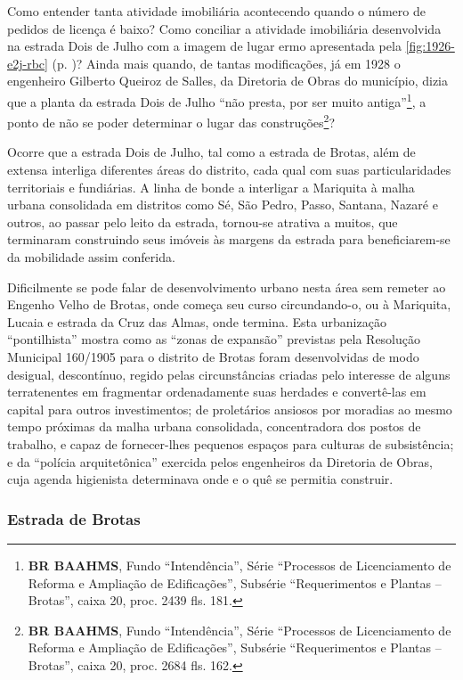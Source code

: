 
Como entender tanta atividade imobiliária acontecendo quando o número de pedidos de licença é baixo? Como conciliar a atividade imobiliária desenvolvida na estrada Dois de Julho com a imagem de lugar ermo apresentada pela \autoref{fig:1926-e2j-rbc} (p. \pageref{fig:1926-e2j-rbc})? Ainda mais quando, de tantas modificações, já em 1928 o engenheiro Gilberto Queiroz de Salles, da Diretoria de Obras do município, dizia que a planta da estrada Dois de Julho ``não presta, por ser muito antiga''\footnote{\textbf{BR BAAHMS}, Fundo ``Intendência'', Série ``Processos de Licenciamento de Reforma e Ampliação de Edificações'', Subsérie ``Requerimentos e Plantas -- Brotas'', caixa 20, proc. 2439 fls. 181.}, a ponto de não se poder determinar o lugar das construções\footnote{\textbf{BR BAAHMS}, Fundo ``Intendência'', Série ``Processos de Licenciamento de Reforma e Ampliação de Edificações'', Subsérie ``Requerimentos e Plantas -- Brotas'', caixa 20, proc. 2684 fls. 162.}?

Ocorre que a estrada Dois de Julho, tal como a estrada de Brotas, além de extensa interliga diferentes áreas do distrito, cada qual com suas particularidades territoriais e fundiárias. A linha de bonde a interligar a Mariquita à malha urbana consolidada em distritos como Sé, São Pedro, Passo, Santana, Nazaré e outros, ao passar pelo leito da estrada, tornou-se atrativa a muitos, que terminaram construindo seus imóveis às margens da estrada para beneficiarem-se da mobilidade assim conferida.

Dificilmente se pode falar de desenvolvimento urbano nesta área sem remeter ao Engenho Velho de Brotas, onde começa seu curso circundando-o, ou à Mariquita, Lucaia e estrada da Cruz das Almas, onde termina. Esta urbanização ``pontilhista'' mostra como as ``zonas de expansão'' previstas pela Resolução Municipal 160/1905 para o distrito de Brotas foram desenvolvidas de modo desigual, descontínuo, regido pelas circunstâncias criadas pelo interesse de alguns terratenentes em fragmentar ordenadamente suas herdades e convertê-las em capital para outros investimentos; de proletários ansiosos por moradias ao mesmo tempo próximas da malha urbana consolidada, concentradora dos postos de trabalho, e capaz de fornecer-lhes pequenos espaços para culturas de subsistência; e da ``polícia arquitetônica'' exercida pelos engenheiros da Diretoria de Obras, cuja agenda higienista determinava onde e o quê se permitia construir.

\subsubsection{Estrada de Brotas}\label{subsubsec:estbrotas}

